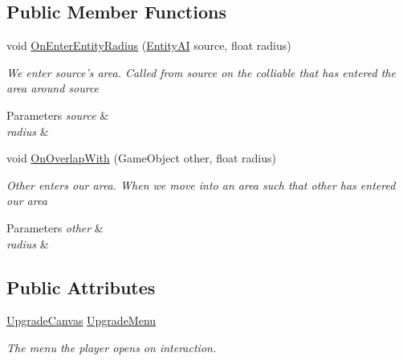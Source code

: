 \subsection*{Public Member Functions}
\begin{DoxyCompactItemize}
\item 
\hypertarget{class_skyrates_1_1_entity_1_1_entity_mooring_ab02449c71583baf95a8e7ee93ea5ed6e}{void \hyperlink{class_skyrates_1_1_entity_1_1_entity_mooring_ab02449c71583baf95a8e7ee93ea5ed6e}{On\-Enter\-Entity\-Radius} (\hyperlink{class_skyrates_1_1_entity_1_1_entity_a_i}{Entity\-A\-I} source, float radius)}\label{class_skyrates_1_1_entity_1_1_entity_mooring_ab02449c71583baf95a8e7ee93ea5ed6e}

\begin{DoxyCompactList}\small\item\em We enter source's area. Called from source on the colliable that has entered the area around source 


\begin{DoxyParams}{Parameters}
{\em source} & \\
\hline
{\em radius} & \\
\hline
\end{DoxyParams}
 \end{DoxyCompactList}\item 
\hypertarget{class_skyrates_1_1_entity_1_1_entity_mooring_af20bacf6321aec707732cd487bcbe812}{void \hyperlink{class_skyrates_1_1_entity_1_1_entity_mooring_af20bacf6321aec707732cd487bcbe812}{On\-Overlap\-With} (Game\-Object other, float radius)}\label{class_skyrates_1_1_entity_1_1_entity_mooring_af20bacf6321aec707732cd487bcbe812}

\begin{DoxyCompactList}\small\item\em Other enters our area. When we move into an area such that other has entered our area 


\begin{DoxyParams}{Parameters}
{\em other} & \\
\hline
{\em radius} & \\
\hline
\end{DoxyParams}
 \end{DoxyCompactList}\end{DoxyCompactItemize}
\subsection*{Public Attributes}
\begin{DoxyCompactItemize}
\item 
\hyperlink{class_skyrates_1_1_u_i_1_1_upgrade_canvas}{Upgrade\-Canvas} \hyperlink{class_skyrates_1_1_entity_1_1_entity_mooring_afea86c223b57c927c31d9b16201841fc}{Upgrade\-Menu}
\begin{DoxyCompactList}\small\item\em The menu the player opens on interaction. \end{DoxyCompactList}\end{DoxyCompactItemize}
